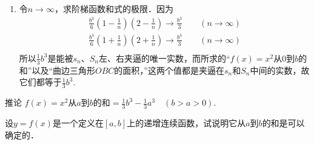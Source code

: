 \begin{solution}
\begin{enumerate}
\item 令$n\to\infty$，求阶梯函数和式的极限．因为
\begin{align*}
    \frac{b^3}{6} \left(1-\frac{1}{n}\right)\left(2-\frac{1}{n}\right)\to \frac{b^3}{3}\qquad (n\to\infty)\\
    \frac{b^3}{6} \left(1+\frac{1}{n}\right)\left(2+\frac{1}{n}\right)\to \frac{b^3}{3}\qquad (n\to\infty)\\
\end{align*}
所以$\frac{1}{3}b^3$是能被$s_n$、$S_n$左、右夹逼的唯一实数，而所求的“$f(x)=x^2$从0到$b$的和”以及“曲边三角形$OBC$的面积，”这两个值都是夹逼在$s_n$和$S_n$中间的实数，故它们都等于$\frac{1}{3}b^3$.
\end{enumerate}
\end{solution}

\begin{blk}
    {推论} $f(x)=x^2$从$a$到$b$的和$=\frac{1}{3}b^3-\frac{1}{3}a^3\quad  (b> a> 0)$.
\end{blk}


\begin{example}
设$y=f(x)$是一个定义在$[a,b]$上的递增连续函数，试说明它从$a$到$b$的和是可以确定的．
\end{example}

\begin{figure}[htp]
    \centering
{}
    \caption{}\label{fig:chapter3_sec1_monotone f}
\end{figure}

